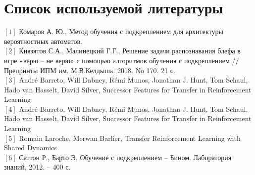 \documentclass[12pt, a4paper]{report}
\theoremstyle{definition}
\theoremstyle{plain}
\theoremstyle{remark}
\theoremstyle{remark}
\theoremstyle{definition}
\begin{document}
\newpage
\section{Список используемой литературы} 
$[1]$ Комаров А. Ю., Метод обучения с подкреплением для архитектуры вероятностных автоматов.\\
$[2]$ Князятов С.А., Малинецкий Г.Г.,
Решение задачи распознавания блефа в игре «верю – не верю» с помощью алгоритмов
обучения с подкреплением // Препринты ИПМ им. М.В.Келдыша. 2018. No 170. 21 с.\\
$[3]$ André Barreto, Will Dabney, Rémi Munos, Jonathan J. Hunt,
Tom Schaul, Hado van Hasselt, David Silver, Successor Features for
Transfer in Reinforcement Learning \\
$[4]$ André Barreto, Will Dabney, Rémi Munos, Jonathan J. Hunt,
Tom Schaul, Hado van Hasselt, David Silver, Successor Features for
Transfer in Reinforcement Learning \\
$[5]$ Romain Laroche, Merwan Barlier, Transfer Reinforcement Learning with Shared Dynamics \\
$[6]$ Саттон Р., Барто Э. Обучение с подкреплением – Бином. Лаборатория знаний,
2012. – 400 с.
\end{document}
